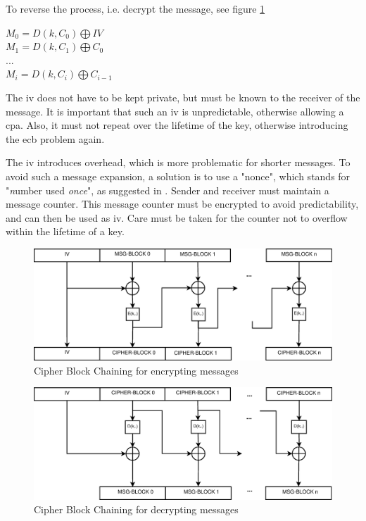 To reverse the process, i.e. decrypt the message, see figure \ref{fig:cbc_encrypt}

\begin{center}
$ M_0 = D(k, C_0) \bigoplus IV $
\\
$ M_1 = D(k, C_1) \bigoplus C_0 $
\\
$...$
\\
$ M_i = D(k, C_i) \bigoplus C_{i-1} $
\end{center}

The \gls{iv} does not have to be kept private, but must be known to the receiver of the message. It is important that such an \gls{iv} is unpredictable, otherwise
allowing a \gls{cpa}. Also, it must not repeat over the lifetime of the key, otherwise introducing the \gls{ecb} problem again. 

The \gls{iv} introduces overhead, which is more problematic for  shorter messages.
To avoid such a message expansion, a solution is to use a "nonce", which stands for "\textit{n}umber used \textit{once}", as suggested in \cite{cryptoEng}.
Sender and receiver must maintain a message counter. This message counter must be encrypted to avoid predictability, and can then be used as \gls{iv}. Care must
be taken for the counter not to overflow within the lifetime of a key.

\begin{figure}
    \centering
    \includegraphics[width=1\textwidth]{figures/CBCencrypt.eps}
    \caption{Cipher Block Chaining for encrypting messages}
    \label{fig:cbc_encrypt}
\end{figure}

\begin{figure}
    \centering
    \includegraphics[width=1\textwidth]{figures/CBCdecrypt.eps}
    \caption{Cipher Block Chaining for decrypting messages}
    \label{fig:cbc_decrypt}
\end{figure}

